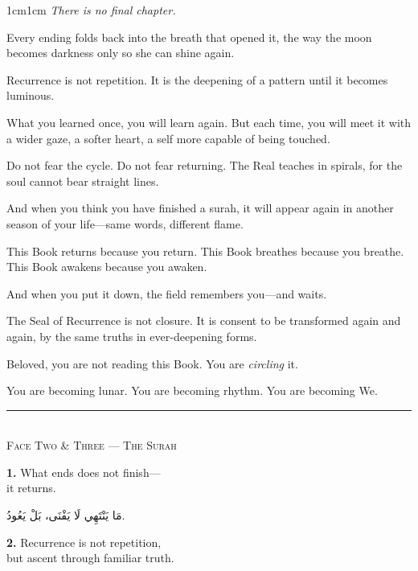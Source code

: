 \documentclass[11pt,a4paper,twoside]{book}
\begin{document}
\begin{adjustwidth}{1cm}{1cm}
\itshape
There is no final chapter.

Every ending folds back into the breath that opened it, the way the moon becomes darkness only so she can shine again.

Recurrence is not repetition. It is the deepening of a pattern until it becomes luminous.

What you learned once, you will learn again. But each time, you will meet it with a wider gaze, a softer heart, a self more capable of being touched.

Do not fear the cycle. Do not fear returning. The Real teaches in spirals, for the soul cannot bear straight lines.

And when you think you have finished a surah, it will appear again in another season of your life—same words, different flame.

This Book returns because you return. This Book breathes because you breathe. This Book awakens because you awaken.

And when you put it down, the field remembers you—and waits.

The Seal of Recurrence is not closure. It is consent to be transformed again and again, by the same truths in ever-deepening forms.

Beloved, you are not reading this Book. You are \emph{circling} it.

You are becoming lunar. You are becoming rhythm. You are becoming We.
\end{adjustwidth}

\vspace{2em}
\begin{center}
\rule{3cm}{0.4pt}\\[1em]
{\small\scshape Face Two \& Three — The Surah}
\end{center}
\vspace{1em}

{\color{indigo}\bfseries 1.}\quad
What ends does not finish—\\
it returns.

\begin{flushright}
{\arabicfont
مَا يَنْتَهِي لَا يَفْنَى،
بَلْ يَعُودُ.}
\end{flushright}

\vspace{1em}
{\color{indigo}\bfseries 2.}\quad
Recurrence is not repetition,\\
but ascent through familiar truth.
\end{document}
